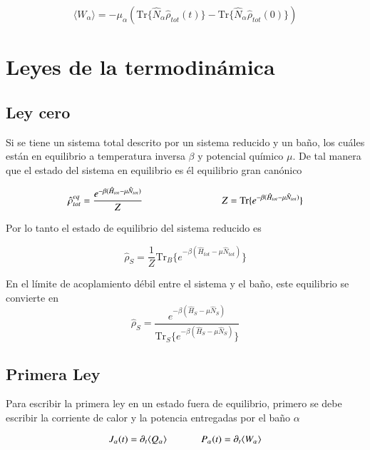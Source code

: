 \begin{equation*}
    \langle W_{\alpha}\rangle = - \mu_{\alpha} (\text{Tr}\{\hat{N}_{\alpha} \hat{\rho}_{tot}(t) \} - \text{Tr}\{\hat{N}_{\alpha}\hat{\rho}_{tot}(0) \}  )
\end{equation*}
\label{sec3workheat}

\newpage

\section{Leyes de la termodinámica}
\label{Leyestermo}
\subsection{Ley cero}
Si se tiene un sistema total descrito por un sistema reducido y un baño, los cuáles están en equilibrio a temperatura inversa $\beta$ y potencial químico $\mu$. De tal manera que el estado del sistema en equilibrio es él equilibrio gran canónico

\begin{equation*}
    \hat{\rho}^{eq}_{tot} = \frac{e^{-\beta(\hat{H}_{tot} - \mu \hat{N}_{tot})}}{Z}  \hspace{28mm} Z = \text{Tr}\{e^{-\beta(\hat{H}_{tot} - \mu \hat{N}_{tot})} \}
\end{equation*}

Por lo tanto el estado de equilibrio del sistema reducido es

\begin{equation*}
    \hat{\rho}_{S} = \frac{1}{Z}\text{Tr}_{B}\{ e^{-\beta(\hat{H}_{tot} - \mu \hat{N}_{tot})} \}
\end{equation*}

En el límite de acoplamiento débil entre el sistema y el baño, este equilibrio se convierte en \cite{geva2000second}
\begin{equation*}
    \hat{\rho}_{S} = \frac{e^{-\beta(\hat{H}_{S} - \mu\hat{N}_{S})}}{\text{Tr}_{S}\{e^{-\beta(\hat{H}_{S} - \mu \hat{N}_{S})} \} }
\end{equation*}

\subsection{Primera Ley}
Para escribir la primera ley en un estado fuera de equilibrio, primero se debe escribir la corriente de calor y la potencia entregadas por el baño $\alpha$

\begin{equation*}
    J_{\alpha}(t) = \partial_{t}\langle Q_{\alpha}\rangle \hspace{12mm}  P_{\alpha}(t) = \partial_{t}\langle W_{\alpha}\rangle
\end{equation*}

